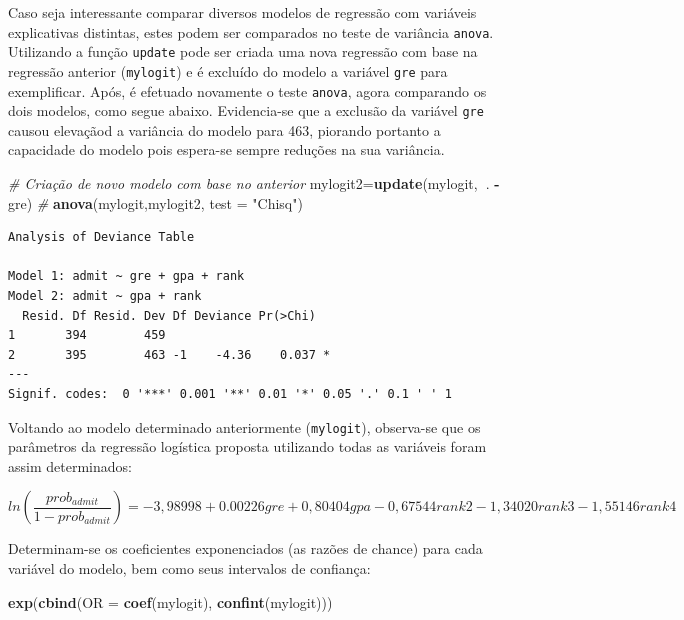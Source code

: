 \documentclass[12pt,brazil,oneside]{book}
\newenvironment{Shaded}{\begin{snugshade}}{\end{snugshade}}
\newcommand{\CommentTok}[1]{\textcolor[rgb]{0.56,0.35,0.01}{\textit{#1}}}
\newcommand{\DataTypeTok}[1]{\textcolor[rgb]{0.13,0.29,0.53}{#1}}
\newcommand{\KeywordTok}[1]{\textcolor[rgb]{0.13,0.29,0.53}{\textbf{#1}}}
\newcommand{\NormalTok}[1]{#1}
\newcommand{\OperatorTok}[1]{\textcolor[rgb]{0.81,0.36,0.00}{\textbf{#1}}}
\newcommand{\StringTok}[1]{\textcolor[rgb]{0.31,0.60,0.02}{#1}}
\begin{document}
Caso seja interessante comparar diversos modelos de regressão com
variáveis explicativas distintas, estes podem ser comparados no teste de
variância \texttt{anova}. Utilizando a função \texttt{update} pode ser
criada uma nova regressão com base na regressão anterior
(\texttt{mylogit}) e é excluído do modelo a variável \texttt{gre} para
exemplificar. Após, é efetuado novamente o teste \texttt{anova}, agora
comparando os dois modelos, como segue abaixo. Evidencia-se que a
exclusão da variável \texttt{gre} causou elevaçãod a variância do modelo
para 463, piorando portanto a capacidade do modelo pois espera-se sempre
reduções na sua variância.

\begin{Shaded}
\begin{Highlighting}[]
\CommentTok{# Criação de novo modelo com base no anterior}
\NormalTok{mylogit2=}\KeywordTok{update}\NormalTok{(mylogit,}\OperatorTok{~}\NormalTok{. }\OperatorTok{-}\StringTok{ }\NormalTok{gre)}
\CommentTok{# }
\KeywordTok{anova}\NormalTok{(mylogit,mylogit2, }\DataTypeTok{test =} \StringTok{"Chisq"}\NormalTok{)}
\end{Highlighting}
\end{Shaded}

\begin{verbatim}
Analysis of Deviance Table

Model 1: admit ~ gre + gpa + rank
Model 2: admit ~ gpa + rank
  Resid. Df Resid. Dev Df Deviance Pr(>Chi)  
1       394        459                       
2       395        463 -1    -4.36    0.037 *
---
Signif. codes:  0 '***' 0.001 '**' 0.01 '*' 0.05 '.' 0.1 ' ' 1
\end{verbatim}

Voltando ao modelo determinado anteriormente (\texttt{mylogit}),
observa-se que os parâmetros da regressão logística proposta utilizando
todas as variáveis foram assim determinados:

\[
ln\left (\frac{prob_{admit}}{1-prob_{admit}}  \right ) = 
-3,98998 + 0.00226gre + 0,80404gpa -0,67544rank2 -1,34020rank3 -1,55146rank4
\]

Determinam-se os coeficientes exponenciados (as razões de chance) para
cada variável do modelo, bem como seus intervalos de confiança:

\begin{Shaded}
\begin{Highlighting}[]
\KeywordTok{exp}\NormalTok{(}\KeywordTok{cbind}\NormalTok{(}\DataTypeTok{OR =} \KeywordTok{coef}\NormalTok{(mylogit), }\KeywordTok{confint}\NormalTok{(mylogit)))}
\end{Highlighting}
\end{Shaded}
\end{document}
